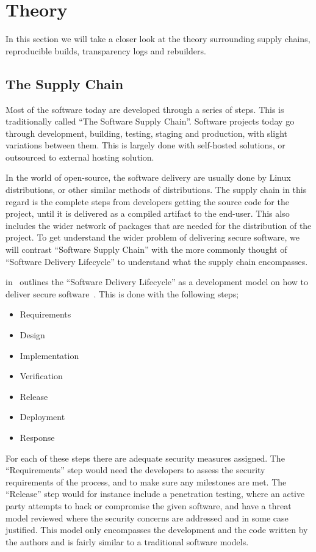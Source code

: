 \documentclass[../Main/thesis.tex]{subfiles}
\begin{document}
\chapter{Theory}
\label{ch:theory}
In this section we will take a closer look at the theory surrounding
supply chains, reproducible builds, transparency logs and rebuilders.

\section{The Supply Chain}\label{sec:supply_chain}
Most of the software today are developed through a series of steps. This is
traditionally called ``The Software Supply Chain''. Software projects today go
through development, building, testing, staging and production, with slight
variations between them. This is largely done with self-hosted solutions, or
outsourced to external hosting solution.

In the world of open-source, the software delivery are usually done by Linux
distributions, or other similar methods of distributions. The supply chain in
this regard is the complete steps from developers getting the source code for
the project, until it is delivered as a compiled artifact to the end-user. This
also includes the wider network of packages that are needed for the distribution
of the project. To get understand the wider problem of delivering secure
software, we will contrast ``Software Supply Chain'' with the more commonly
thought of ``Software Delivery Lifecycle'' to understand what the supply chain
encompasses.

\citeauthor{10.1109CSAC.2004.41} in~ outlines the
``Software Delivery Lifecycle'' as a development model on how to deliver secure
software~\cite{10.1109CSAC.2004.41}. This is done with the following steps;

\begin{itemize}
    \item Requirements
    \item Design
    \item Implementation
    \item Verification 
    \item Release
    \item Deployment
    \item Response
\end{itemize}

For each of these steps there are adequate security measures assigned. The
``Requirements'' step would need the developers to assess the security
requirements of the process, and to make sure any milestones are met. The
``Release'' step would for instance include a penetration testing, where an
active party attempts to hack or compromise the given software, and have a
threat model reviewed where the security concerns are addressed and in some case
justified. This model only encompasses the development and the code written by
the authors and is fairly similar to a traditional software models. 
\end{document}
